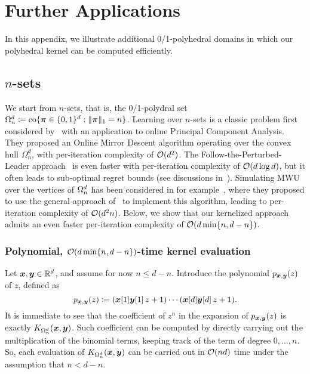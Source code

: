 \section{Further Applications}\label{app:applications}

In this appendix, we illustrate additional 0/1-polyhedral domains in which our polyhedral kernel can be computed efficiently.

\subsection{$n$-sets}\label{sec:nsets}

We start from $n$-sets, that is, the 0/1-polydral set $\Omega^d_n \coloneqq \textrm{co}\{\bm{\pi} \in \{0,1\}^d: \|\bm{\pi}\|_1 = n\}$. Learning over $n$-sets is a classic problem first considered by~\citet{warmuth2008randomized} with an application to online Principal Component Analysis.
They proposed an Online Mirror Descent algorithm operating over the convex hull $\Omega^d_n$, with per-iteration complexity of $\mathcal{O}(d^2)$.
The Follow-the-Perturbed-Leader approach~\citep{Kalai05:Efficient} is even faster with per-iteration complexity of $\mathcal{O}(d\log d)$, but it often leads to sub-optimal regret bounds (see discussions in~\citep{koolen2010hedging}).
Simulating MWU over the vertices of ${\Omega^d_n}$ has been considered in for example~\citep{cesa2012combinatorial}, where they proposed to use the general approach of~\citep{Takimoto03:Path} to implement this algorithm, leading to per-iteration complexity of $\mathcal{O}(d^2 n)$.
Below, we show that our kernelized approach admits an even faster per-iteration complexity of $\mathcal{O}(d\min\{n, d-n\})$.

\subsubsection{Polynomial, $\mathcal{O}(d \min\{n, d-n\})$-time kernel evaluation} Let $\bm{x}, \bm{y} \in {\mathbb{R}}^d$, and assume for now $n \le d-n$. Introduce the polynomial $p_{\bm{x},\bm{y}}(z)$ of $z$, defined as
\[
    p_{\bm{x},\bm{y}}(z) \coloneqq (\bm{x}[1]\bm{y}[1]\, z + 1) \cdots (\bm{x}[d]\bm{y}[d]\, z + 1).
\]
It is immediate to see that the coefficient of $z^n$ in the expansion of $p_{\bm{x},\bm{y}}(z)$ is exactly $K_{{\Omega^d_n}}(\bm{x}, \bm{y})$. Such coefficient can be computed by directly carrying out the multiplication of the binomial terms, keeping track of the term of degree $0,\dots,n$. So, each evaluation of $K_{\Omega^d_n}(\bm{x},\bm{y})$ can be carried out in $\mathcal{O}(nd)$ time under the assumption that $n < d-n$.

